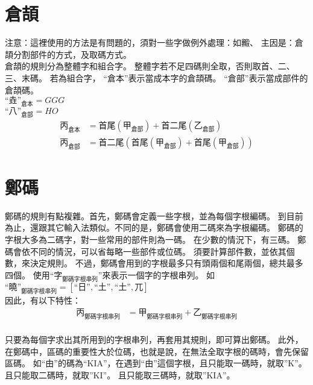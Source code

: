\documentclass{article}
\begin{document}
\section{倉頡}
{\LARGE
注意：這裡使用的方法是有問題的，須對一些字做例外處理：如毈、
主因是：倉頡分割部件的方式，及取碼方式。
}\\

倉頡的規則分為整體字和組合字。
整體字若不足四碼則全取，否則取首、二、三、末碼。
若為組合字，
``倉本''表示當成本字的倉頡碼。
``倉部''表示當成部件的倉頡碼。\\
$\mbox{``垚''}_{\mbox{倉本}}=GGG$\\
$\mbox{``八''}_{\mbox{倉部}}=HO$\\

\begin{subequations}
  \begin{align}
  \mbox{丙}_{\mbox{倉本}}&=\mbox{首尾}(\mbox{甲}_{\mbox{倉部}})
      + \mbox{首二尾}({\mbox{乙}_{\mbox{倉部}}})\\
  \mbox{丙}_{\mbox{倉部}}&= \mbox{首二尾}(
      \mbox{首尾}(\mbox{甲}_{\mbox{倉部}})
      + \mbox{首尾}(\mbox{甲}_{\mbox{倉部}})
      )
  \end{align}
\end{subequations}

\section{鄭碼}
鄭碼的規則有點複雜。首先，鄭碼會定義一些字根，並為每個字根編碼。
到目前為止，還跟其它輸入法類似。不同的是，鄭碼會使用二碼來為字根編碼。
鄭碼的字根大多為二碼字，對一些常用的部件則為一碼。
在少數的情況下，有三碼。
鄭碼會依不同的情況，可以省每略一些部件或位碼。
須要計算部件數，並依其個數，來決定規則。
不過，鄭碼會用到的字根最多只有頭兩個和尾兩個，總共最多四個。
使用``$\mbox{字}_{\mbox{鄭碼字根串列}}$''來表示一個字的字根串列。
如$\mbox{``曉''}_{\mbox{鄭碼字根串列}}=[\mbox{``日''}, \mbox{``土''}, \mbox{``土''}, \mbox{兀}]$\\

因此，有以下特性：
\begin{subequations}
  \begin{align}
  \mbox{丙}_{\mbox{鄭碼字根串列}} &= \mbox{甲}_{\mbox{鄭碼字根串列}} + \mbox{乙}_{\mbox{鄭碼字根串列}} \\
  \end{align}
\end{subequations}

只要為每個字求出其所用到的字根串列，再套用其規則，即可算出鄭碼。
此外，在鄭碼中，區碼的重要性大於位碼，也就是說，在無法全取字根的碼時，會先保留區碼。
如``由''的碼為``KIA''，在遇到``由''這個字根，且只能取一碼時，就取''K''。
且只能取二碼時，就取''KI''。
且只能取三碼時，就取''KIA''。
\end{document}

